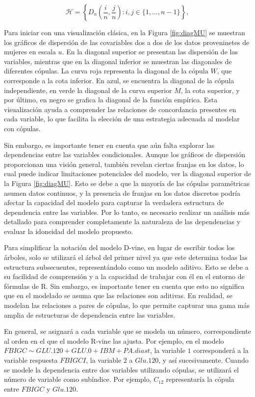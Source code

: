 \begin{equation}\label{H}
    \mathscr{H} =\left\{ D_n\left( \frac{i}{n}, \frac{j}{n}\right) : i, j \in\{1, \ldots, n-1\}\right\},
\end{equation}


Para iniciar con una visualización clásica, en la Figura \ref{fig:diagMU} se muestran los gráficos de dispersión de las covariables dos a dos de los datos proveninetes de mujeres en escala $u$. En la diagonal superior se presentan las dispersión de las variables, mientras que en la diagonal inferior se muestran las diagonales de diferentes cópulas. La curva roja representa la diagonal de la cópula $W$, que corresponde a la cota inferior. En azul, se encuentra la diagonal de la cópula independiente, en verde la diagonal de la curva superior $M$, la cota superior, y por último, en negro se grafica la diagonal de la función empírica. Esta visualización ayuda a comprender las relaciones de concordancia presentes en cada variable, lo que facilita la elección de una estrategia adecuada al modelar con cópulas.


Sin embargo, es importante tener en cuenta que aún falta explorar las dependencias entre las variables condicionales. Aunque los gráficos de dispersión proporcionan una visión general, también revelan ciertas franjas en los datos, lo cual puede indicar limitaciones potenciales del modelo, ver la diagonal superior de la Figura \ref{fig:diagMU}. Esto se debe a que la mayoría de las cópulas paramétricas asumen datos continuos, y la presencia de franjas en los datos discretos podría afectar la capacidad del modelo para capturar la verdadera estructura de dependencia entre las variables. Por lo tanto, es necesario realizar un análisis más detallado para comprender completamente la naturaleza de las dependencias y evaluar la idoneidad del modelo propuesto.

Para simplificar la notación del modelo D-vine, en lugar de escribir todos los árboles, solo se utilizará el árbol del primer nivel ya que este determina todas las estructura subsecuentes, representándolo como un modelo aditivo. Esto se debe a su facilidad de comprensión y a la capacidad de trabajar con él en el entorno de fórmulas de R. Sin embargo, es importante tener en cuenta que esto no significa que en el modelado se asuma que las relaciones son aditivas. En realidad, se modelan las relaciones a pares de cópulas, lo que permite capturar una gama más amplia de estructuras de dependencia entre las variables.

En general, se asignará a cada variable que se modela un número, correspondiente al orden en el que el modelo R-vine las ajusta. Por ejemplo, en el modelo $FBIGC \sim GLU.120 + GLU.0 + IBM + PA.diast$, la variable $1$ corresponderá a la variable respuesta $FBIGCI$, la variable $2$ a $Glu.120$, y así sucesivamente. Cuando se modele la dependencia entre dos variables utilizando cópulas, se utilizará el número de variable como subíndice. Por ejemplo, $C_{12}$ representaría la cópula entre $FBIGC$ y $Glu.120$.

